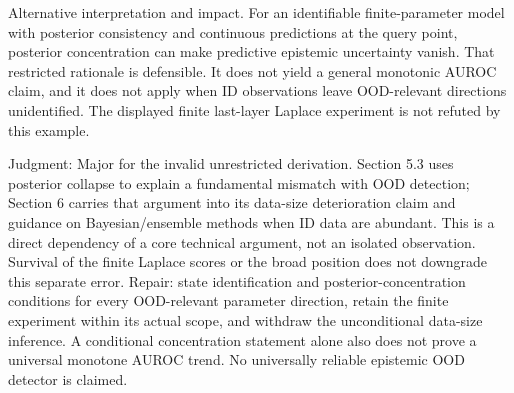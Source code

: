 \documentclass[10pt]{article}
\begin{document}
Alternative interpretation and impact. For an identifiable finite-parameter model with posterior consistency and continuous predictions at the query point, posterior concentration can make predictive epistemic uncertainty vanish. That restricted rationale is defensible. It does not yield a general monotonic AUROC claim, and it does not apply when ID observations leave OOD-relevant directions unidentified. The displayed finite last-layer Laplace experiment is not refuted by this example.\par
Judgment: Major for the invalid unrestricted derivation. Section 5.3 uses posterior collapse to explain a fundamental mismatch with OOD detection; Section 6 carries that argument into its data-size deterioration claim and guidance on Bayesian/ensemble methods when ID data are abundant. This is a direct dependency of a core technical argument, not an isolated observation. Survival of the finite Laplace scores or the broad position does not downgrade this separate error. Repair: state identification and posterior-concentration conditions for every OOD-relevant parameter direction, retain the finite experiment within its actual scope, and withdraw the unconditional data-size inference. A conditional concentration statement alone also does not prove a universal monotone AUROC trend. No universally reliable epistemic OOD detector is claimed.\par
\end{document}
